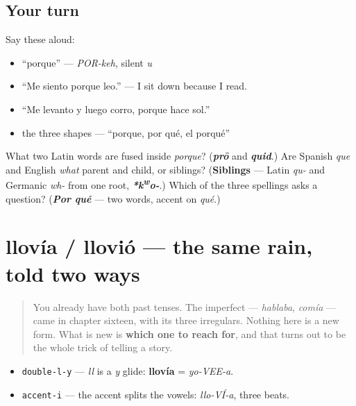 \subsection*{Your turn}
Say these aloud:

\begin{itemize}
\raggedright
  \item \textquotedblleft{}porque\textquotedblright{} — \emph{POR-keh}, silent \emph{u}
  \item \textquotedblleft{}Me siento porque leo.\textquotedblright{} — I sit down because I read.
  \item \textquotedblleft{}Me levanto y luego corro, porque hace sol.\textquotedblright{}
  \item the three shapes — \textquotedblleft{}porque, por qué, el porqué\textquotedblright{}
\end{itemize}

\begin{tcolorbox}[breakable,colback=teal!4,colframe=teal!35!black,title={Before you move on}]
What two Latin words are fused inside \emph{porque}? (\emph{\textbf{prō}} and \emph{\textbf{quid}}.) Are Spanish \emph{que} and English \emph{what} parent and child, or siblings? (\textbf{Siblings} — Latin \emph{qu-} and Germanic \emph{wh-} from one root, \emph{\textbf{*k\textsuperscript{w}o-}}.) Which of the three spellings asks a question? (\emph{\textbf{Por qué}} — two words, accent on \emph{qué}.)
\end{tcolorbox}
\section[llovía / llovió]{llovía / llovió — the same rain, told two ways}

\label{lesson:ES-C38-imperfecto}



\begin{quote}
You already have both past tenses. The imperfect — \emph{hablaba}, \emph{comía} — came in chapter sixteen, with its three irregulars. Nothing here is a new form. What is new is \textbf{which one to reach for}, and that turns out to be the whole trick of telling a story.
\end{quote}

\begin{sounds}
\begin{itemize}
\raggedright
  \item \texttt{double-l-y} — \emph{ll} is a \emph{y} glide: \textbf{llovía} = \emph{yo-VEE-a}.
  \item \texttt{accent-i} — the accent splits the vowels: \emph{llo-VÍ-a}, three beats.
\end{itemize}
\end{sounds}

